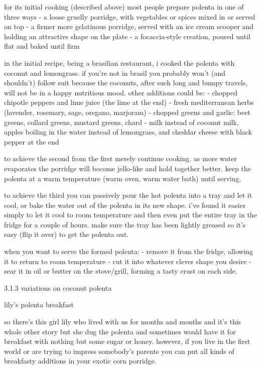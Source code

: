for its initial cooking (described above) most people prepare polenta in one of three ways
	-	a loose gruelly porridge, with vegetables or spices mixed in or served on top
	-	a firmer more gelatinous porridge, served with an ice cream scooper and holding an attractive shape on the plate
	-	a focaccia-style creation, poured until flat and baked until firm

in the initial recipe, being a brasilian restaurant, i cooked the polenta with coconut and lemongrass. if you're not in brasil you probably won't (and shouldn't) follow suit because the coconuts, after such long and bumpy travels, will not be in a happy nutritious mood. other additions could be:
	-	chopped chipotle peppers and lime juice (the lime at the end)
	-	fresh mediterranean herbs (lavender, rosemary, sage, oregano, marjoram)
	-	chopped greens and garlic: beet greens, collard greens, mustard greens, chard
	-	milk instead of coconut milk, apples boiling in the water instead of lemongrass, and cheddar cheese with black pepper at the end

to achieve the second from the first merely continue cooking. as more water evaporates the porridge will become jello-like and hold together better. keep the polenta at a warm temperature (warm oven, warm water bath) until serving.

to achieve the third you can passively pour the hot polenta into a tray and let it cool, or bake the water out of the polenta in its new shape. i've found it easier simply to let it cool to room temperature and then even put the entire tray in the fridge for a couple of hours. make sure the tray has been lightly greased so it's easy (flip it over) to get the polenta out. 

when you want to serve the formed polenta:
	-	remove it from the fridge, allowing it to return to room temperature
	-	cut it into whatever clever shape you desire
	-	sear it in oil or butter on the stove/grill, forming a tasty crust on each side.

3.1.3  variations on coconut polenta

lily's polenta breakfast

so there's this girl lily who lived with us for months and months and it's this whole other story but she dug the polenta and sometimes would have it for breakfast with nothing but some sugar or honey. however, if you live in the first world or are trying to impress somebody's parents you can put all kinds of breakfasty additions in your exotic corn porridge.

